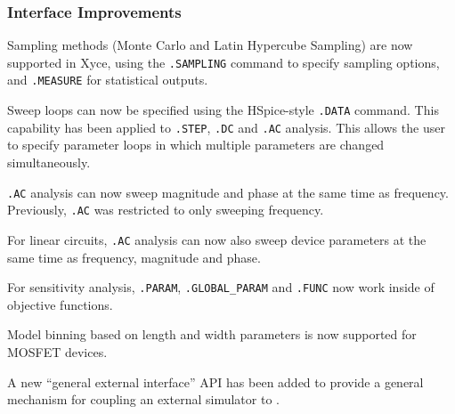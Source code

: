 \documentclass{article}
\begin{document}
\subsubsection*{Interface Improvements}
\begin{XyceItemize}
\item Sampling methods (Monte Carlo and Latin Hypercube Sampling) are
  now supported in Xyce, using the \texttt{.SAMPLING} command to
  specify sampling options, and \texttt{.MEASURE} for statistical
  outputs.
\item Sweep loops can now be specified using the HSpice-style
  \texttt{.DATA} command.  This capability has been applied to
  \texttt{.STEP}, \texttt{.DC} and \texttt{.AC} analysis.  This allows
  the user to specify parameter loops in which multiple parameters are
  changed simultaneously.
\item \texttt{.AC} analysis can now sweep magnitude and phase at the
  same time as frequency.  Previously, \texttt{.AC} was restricted to
  only sweeping frequency.
\item For linear circuits, \texttt{.AC} analysis can now also sweep
  device parameters at the same time as frequency, magnitude and
  phase.
\item For sensitivity analysis, \texttt{.PARAM},
  \texttt{.GLOBAL\_PARAM} and \texttt{.FUNC} now work inside of
  objective functions.
\item Model binning based on length and width parameters is now
  supported for MOSFET devices.
\item A new ``general external interface'' API has been added to provide a
  general mechanism for coupling an external simulator to \Xyce{}.
\end{XyceItemize}
\end{document}
